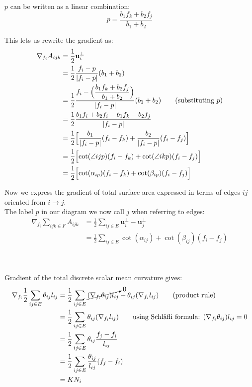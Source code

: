 \documentclass{article}
\newcommand\ifrac[2]{{\displaystyle\frac{#1}{#2}}}
\def\grad{\nabla}
\def\hal{\ifrac{1}{2}}
\begin{document}
$p$ can be written as a linear combination: $$p = \ifrac{b_1 f_k + b_2 f_j}{b_1 + b_2}$$

This lets us rewrite the gradient as:
\begin{align*}
    \grad_{f_i} A_{ijk} &= \hal \mathbf{u}_i^\perp\\
        &= \hal \ifrac{f_i - p}{|f_i - p|} (b_1 + b_2)\\
        &= \hal \ifrac{f_i - \Big(\ifrac{b_1 f_k + b_2 f_j}{b_1 + b_2}\Big)}{|f_i - p|} (b_1 + b_2)   \tag*{\text{(substituting $p$)}}\\
        &= \hal \ifrac{b_1 f_i + b_2 f_i - b_1 f_k - b_2 f_j}{|f_i - p|} \\
        &= \hal \Bigl[\frac{b_1}{|f_i - p|} (f_i - f_k) + \frac{b_2}{|f_i - p|} (f_i - f_j)\Bigr] \\
        &= \hal \Bigl[\cot(\angle ijp) (f_i - f_k) + \cot(\angle ikp) (f_i - f_j)\Bigr] \\
        &= \hal \Bigl[\cot(\alpha_{ip}) (f_i - f_k) + \cot(\beta_{ip}) (f_i - f_j)\Bigr] \\
\end{align*}

Now we express the gradient of total surface area expressed in terms of edges $ij$ oriented from $i \rightarrow j$.\\
The label $p$ in our diagram we now call $j$ when referring to edges:
\begin{align*}
    \grad_{f_i} \sum_{ijk \in F} A_{ijk} &= \hal \sum_{ij \in E}  \mathbf{u}_i^\perp -  \mathbf{u}_j^\perp\\
        &= \hal \sum_{ij \in E} \cot(\alpha_{ij}) + \cot(\beta_{ij}) (f_i - f_j)
\end{align*}


\vspace{1.8cm}
\\\\


Gradient of the total discrete scalar mean curvature gives:
\begin{align*}
    \nabla_{f_i} \hal \sum_{ij \in E} \theta_{ij} l_{ij} &= \hal \sum_{ij \in E} \cancelto{0}{(\nabla_{f_i} \theta_{ij}) l_{ij}} + \theta_{ij} (\nabla_{f_i} l_{ij}) \tag*{\text{(product rule)}}\\
        &= \hal \sum_{ij \in E} \theta_{ij} (\nabla_{f_i} l_{ij}) \tag*{using Schläfli formula: $(\nabla_{f_i} \theta_{ij}) l_{ij} = 0$}\\
        &= \hal \sum_{ij \in E} \theta_{ij} \frac{f_j - f_i}{l_{ij}} \\
        &= \hal \sum_{ij \in E} \frac{\theta_{ij}}{l_{ij}} (f_j - f_i) \\
        &= K N_i
\end{align*}
\end{document}

